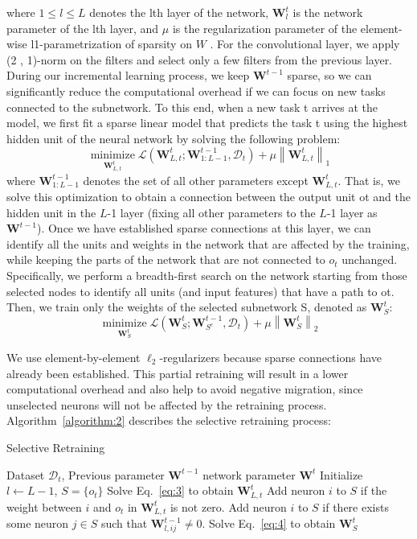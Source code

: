where $1 \leq l \leq L$ denotes the lth layer of the network, $\boldsymbol{W}_{l}^{t}$ is the network parameter of the lth layer, and $\mu$ is the regularization parameter of the element-wise l1-parametrization of sparsity on $W$ . For the convolutional layer, we apply (2 , 1)-norm on the filters and select only a few filters from the previous layer.
During our incremental learning process, we keep $\boldsymbol{W}^{t-1}$ sparse, so we can significantly reduce the computational overhead if we can focus on new tasks connected to the subnetwork. To this end, when a new task t arrives at the model, we first fit a sparse linear model that predicts the task t using the highest hidden unit of the neural network by solving the following problem:
$$
\underset{\boldsymbol{W}_{L, t}^{t}}{\operatorname{minimize}} \mathcal{L}\left(\boldsymbol{W}_{L, t}^{t} ; \boldsymbol{W}_{1: L-1}^{t-1}, \mathcal{D}_{t}\right)+\mu\left\|\boldsymbol{W}_{L, t}^{t}\right\|_{1}
\label{eq:3}
$$
where $\boldsymbol{W}_{1: L-1}^{t-1}$ denotes the set of all other parameters except $\boldsymbol{W}_{L, t}^{t}$. That is, we solve this optimization to obtain a connection between the output unit ot and the hidden unit in the $L$-1 layer (fixing all other parameters to the $L$-1 layer as $\boldsymbol{W}^{t-1}$). Once we have established sparse connections at this layer, we can identify all the units and weights in the network that are affected by the training, while keeping the parts of the network that are not connected to $o_t$ unchanged. Specifically, we perform a breadth-first search on the network starting from those selected nodes to identify all units (and input features) that have a path to ot. Then, we train only the weights of the selected subnetwork S, denoted as $\boldsymbol{W}_{S}^{t}$:
$$
\underset{\boldsymbol{W}_{S}^{t}}{\operatorname{minimize}} \mathcal{L}\left(\boldsymbol{W}_{S}^{t} ; \boldsymbol{W}_{S^{c}}^{t-1}, \mathcal{D}_{t}\right)+\mu\left\|\boldsymbol{W}_{S}^{t}\right\|_{2}
\label{eq:4}
$$

We use element-by-element $\ell_{2}$-regularizers because sparse connections have already been established. This partial retraining will result in a lower computational overhead and also help to avoid negative migration, since unselected neurons will not be affected by the retraining process. Algorithm~\ref{algorithm:2} describes the selective retraining process:

\begin{algorithm}[ht]
	\caption{Selective Retraining}  
	\begin{algorithmic}[1]
		\Require Dataset $\mathcal{D}_t$, Previous parameter $\bm{W}^{t-1}$
		\Ensure network parameter $\bm{W}^t$
		\State Initialize $l\leftarrow L-1$, $S=\{o_t\}$
		\State Solve Eq.~\ref{eq:3} to obtain $\bm{W}^t_{L,t}$
		\State Add neuron $i$ to $S$ if the weight between $i$ and $o_t$ in $\bm{W}^t_{L,t}$ is not zero.
		\State Add neuron $i$ to $S$ if there exists some neuron $j \in S$ such that $\bm{W}^{t-1}_{l,ij}\neq 0$.
		\EndFor
		\State Solve Eq.~\ref{eq:4} to obtain $\bm{W}^t_{S}$
	\end{algorithmic}
	\label{algorithm:2} 
\end{algorithm}

